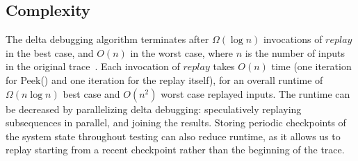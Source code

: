 \subsection{Complexity}
\label{subsec:complexity}

The delta debugging algorithm terminates after $\Omega(\log n)$
invocations of $replay$ in the best case, and $O(n)$ in the worst case, where $n$ is the number of inputs in the original
trace~\cite{Zeller:1999:YMP:318773.318946}.
Each invocation of $replay$ takes $O(n)$ time
(one iteration for {\sc Peek()} and one iteration for the replay itself),
for an overall runtime of $\Omega(n \log n)$ best case and $O(n^2)$ worst case replayed inputs.
The runtime can be decreased by parallelizing delta debugging:
speculatively replaying subsequences in parallel, and joining the results.
Storing periodic checkpoints of the system state throughout testing can also reduce runtime, as it
allows us to replay starting from a recent checkpoint rather than the beginning of the
trace.%




